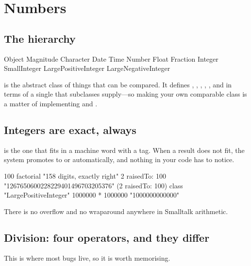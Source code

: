 \chapter{Numbers}
\label{ch:numbers}


\section{The hierarchy}

\begin{plain}
Object
  Magnitude
    Character
    Date
    Time
    Number
      Float
      Fraction
      Integer
        SmallInteger
        LargePositiveInteger
        LargeNegativeInteger
\end{plain}

 is the abstract class of things that can be compared. It
defines \ct{<}, \ct{>}, \ct{<=}, \ct{>=}, ,  and
 in terms of a single \ct{<} that subclasses supply---so making your
own comparable class is a matter of implementing \ct{<} and \ct{=}.

\section{Integers are exact, always}

 is the one that fits in a machine word with a tag. When a
result does not fit, the system promotes to  or
 automatically, and nothing in your code has to
notice.

\begin{st}
100 factorial               "158 digits, exactly right"
2 raisedTo: 100             "1267650600228229401496703205376"
(2 raisedTo: 100) class     "LargePositiveInteger"
1000000 * 1000000           "1000000000000"
\end{st}

There is no overflow and no wraparound anywhere in Smalltalk arithmetic.

\section{Division: four operators, and they differ}

This is where most bugs live, so it is worth memorising.

